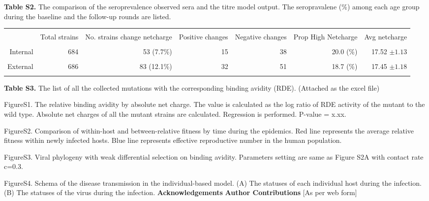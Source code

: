 \documentclass[12pt,a4paper]{article}
\begin{document}
\clearpage


\begin{table}
{\bf Table S2.} The comparison of the seroprevalence observed sera and the titre model output. The seropravalene (\%) among each age group during the baseline and the follow-up rounds are listed.

\begin{tabular*}{16cm}{rrrrrrr}

\hline\hline \\%

  & Total strains&  \parbox[c]{1.8 cm}{\raggedright No. strains change netcharge}  &    \parbox[c]{1.8cm}{\raggedright Positive changes} &   \parbox[c]{1.8cm}{\raggedright Negative changes} &     \parbox[c]{1.8cm}{\raggedright Prop High Netcharge}    &     \parbox[c]{1.8cm}{\raggedright Avg netcharge}   \\
\hline \\ %
Internal &  684 & 53 (7.7\%) &  15 &   38 & 20.0 (\%) & 17.52 $\pm 1.13$\\ \\
External &  686 & 83 (12.1\%) &  32 &   51 & 18.7 (\%)& 17.45 $\pm 1.18$\\ \\
\hline %
\end{tabular*}
\end{table}
\clearpage


{\bf Table S3.} The list of all the collected mutations with the corresponding binding avidity (RDE). (Attached as the excel file)
\clearpage



FigureS1. The relative binding avidity by absolute net charge. The value is calculated as the log ratio of RDE activity of the mutant to the wild type. Absolute net charges of all the mutant strains are calculated. Regression is performed. P-value = x.xx.

FigureS2. Comparison of within-host and between-relative fitness by time during the epidemics.
Red line represents the average relative fitness within newly infected hosts. Blue line represents effective reproductive number in the human population.

FigureS3. Viral phylogeny with weak differential selection on binding avidity. Parameters setting are same as Figure S2A with contact rate c=0.3.

FigureS4. Schema of the disease transmission in the individual-based model. (A) The statuses of each individual host during the infection. (B) The statuses of the virus during the infection.
\clearpage
{\bf Acknowledgements}
{\bf Author Contributions}
[As per web form]
\clearpage
\end{document}
